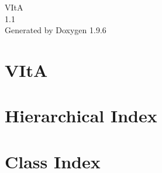 \documentclass[twoside]{book}
\newcommand{\+}{\discretionary{\mbox{\scriptsize$\hookleftarrow$}}{}{}}
\newcommand{\clearemptydoublepage}{%
    \newpage{\pagestyle{empty}\cleardoublepage}%
  }
\begin{document}
  \raggedbottom
    \hypersetup{pageanchor=false,
                bookmarksnumbered=true,
                pdfencoding=unicode
               }
  \begin{titlepage}
  \vspace*{7cm}
  \begin{center}%
  {\Large VItA}\\
  [1ex]\large 1.\+1 \\
  \vspace*{1cm}
  {\large Generated by Doxygen 1.9.6}\\
  \end{center}
  \end{titlepage}
  \clearemptydoublepage
  \tableofcontents
  \clearemptydoublepage
  \hypersetup{pageanchor=true}
\chapter{VItA}
\label{md__r_e_a_d_m_e}

\chapter{Hierarchical Index}

\chapter{Class Index}

\end{document}
